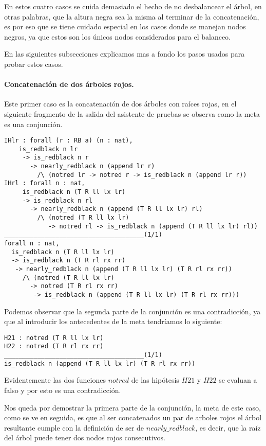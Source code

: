 En estos cuatro casos se cuida demasiado el hecho de no desbalancear el \'arbol, en otras palabras, que la altura negra sea la misma al terminar de la concatenaci\'on, es por eso que se tiene cuidado
especial en los casos donde se manejan nodos negros, ya que estos son los únicos nodos
considerados para el balanceo.

En las siguientes subsecciones explicamos mas a fondo los pasos usados para probar estos casos.


\paragraph{Concatenaci\'on de dos \'arboles rojos.}

Este primer caso es la concatenaci\'on de dos \'arboles con raíces rojas, en el siguiente
fragmento de la salida del asistente de pruebas se observa como la meta es una conjunci\'on.

\begin{verbatim}
IHlr : forall (r : RB a) (n : nat),
    is_redblack n lr
     -> is_redblack n r
       -> nearly_redblack n (append lr r)
         /\ (notred lr -> notred r -> is_redblack n (append lr r))
IHrl : forall n : nat,
     is_redblack n (T R ll lx lr)
     -> is_redblack n rl
       -> nearly_redblack n (append (T R ll lx lr) rl)
         /\ (notred (T R ll lx lr)
            -> notred rl -> is_redblack n (append (T R ll lx lr) rl))
______________________________________(1/1)
forall n : nat,
  is_redblack n (T R ll lx lr)
  -> is_redblack n (T R rl rx rr)
   -> nearly_redblack n (append (T R ll lx lr) (T R rl rx rr))
     /\ (notred (T R ll lx lr)
       -> notred (T R rl rx rr)
        -> is_redblack n (append (T R ll lx lr) (T R rl rx rr)))
\end{verbatim}

Podemos observar que la segunda parte de la conjunci\'on es una contradicci\'on, ya que al
introducir los antecedentes de la meta tendríamos lo siguiente:

\begin{verbatim}
H21 : notred (T R ll lx lr)
H22 : notred (T R rl rx rr)
______________________________________(1/1)
is_redblack n (append (T R ll lx lr) (T R rl rx rr))
\end{verbatim}

Evidentemente las dos funciones $notred$ de las hip\'otesis $H21$ y $H22$ se evaluan a falso y por
esto es una contradicci\'on.

Nos queda por demostrar la primera parte de la conjunci\'on, la meta de este caso, como se ve en
seguida, es que al ser concatenados un par de arboles rojos el árbol resultante cumple con la
definici\'on de ser de $nearly\_redblack$, es decir, que la raíz del \'arbol puede tener dos nodos
rojos consecutivos.

